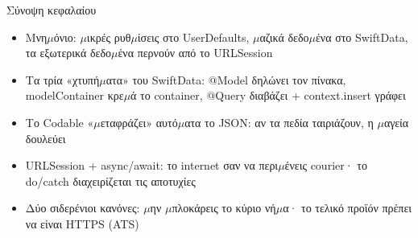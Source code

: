 \begin{tcbsummary}{Σύνοψη κεφαλαίου}
\begin{itemize}
  \item Μνη$\mu$όνιο: $\mu$ικρές ρυθ$\mu$ίσεις στο UserDefaults, $\mu$αζικά δεδο$\mu$ένα στο SwiftData, τα εξωτερικά δεδο$\mu$ένα περνούν από το URLSession
  \item Τα τρία «χτυπή$\mu$ατα» του SwiftData: @Model δηλώνει τον πίνακα, modelContainer κρε$\mu$ά το container, @Query διαβάζει + context.insert γράφει
  \item Το Codable «$\mu$εταφράζει» αυτό$\mu$ατα το JSON: αν τα πεδία ταιριάζουν, η $\mu$αγεία δουλεύει
  \item URLSession + async/await: το internet σαν να περι$\mu$ένεις courier· το do/catch διαχειρίζεται τις αποτυχίες
  \item Δύο σιδερένιοι κανόνες: $\mu$ην $\mu$πλοκάρεις το κύριο νή$\mu$α· το τελικό προϊόν πρέπει να είναι HTTPS (ATS)
\end{itemize}

\end{tcbsummary}
